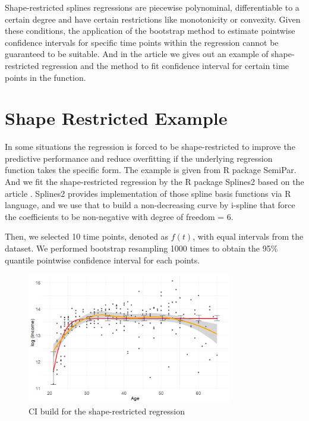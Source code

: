 \documentclass[12pt]{article}
\begin{document}
Shape-restricted splines regressions are piecewise polynominal, differentiable to a certain degree and have certain restrictions like monotonicity or convexity. Given these conditions, the application of the bootstrap method to estimate pointwise confidence intervals for specific time points within the regression cannot be guaranteed to be suitable. And in the article we gives out an example of shape-restricted regression and the method to fit confidence interval for certain time points in the function.









\section{Shape Restricted Example}
\label{Shape Restricted Example}

In some situations the regression is forced to be shape-restricted to improve the predictive performance and reduce overfitting if the underlying regression function takes the specific form. The example is given from R package SemiPar. And we fit the shape-restricted regression by the R package Splines2 based on the article \cite{wang2021shape}. Splines2 provides implementation of those spline basis functions via R language, and we use that to build a non-decreasing curve by i-spline that force the coefficients to be non-negative with degree of freedom = 6.

Then, we selected 10 time points, denoted as $f(t)$, with equal intervals from the dataset. We performed bootstrap resampling 1000 times to obtain the 95\% quantile pointwise confidence interval for each points.

\begin{figure}[H]
  \centering
  \includegraphics[width=0.8\textwidth]{SemiparCI.png}
  \caption{CI build for the shape-restricted regression}
  \label{fig:semipar}
\end{figure}
\end{document}
